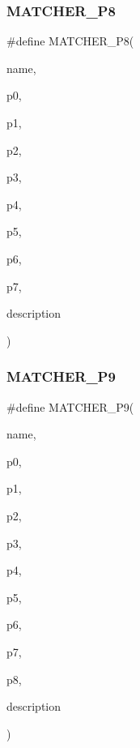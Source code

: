 \subsubsection{\texorpdfstring{MATCHER\_P8}{MATCHER\_P8}}
{\footnotesize\ttfamily \#define M\+A\+T\+C\+H\+E\+R\+\_\+\+P8(\begin{DoxyParamCaption}\item[{}]{name,  }\item[{}]{p0,  }\item[{}]{p1,  }\item[{}]{p2,  }\item[{}]{p3,  }\item[{}]{p4,  }\item[{}]{p5,  }\item[{}]{p6,  }\item[{}]{p7,  }\item[{}]{description }\end{DoxyParamCaption})}

\mbox{\label{gmock-generated-matchers_8h_a2dc1db146d4112c9fde1c2708807e43e}} 
\subsubsection{\texorpdfstring{MATCHER\_P9}{MATCHER\_P9}}
{\footnotesize\ttfamily \#define M\+A\+T\+C\+H\+E\+R\+\_\+\+P9(\begin{DoxyParamCaption}\item[{}]{name,  }\item[{}]{p0,  }\item[{}]{p1,  }\item[{}]{p2,  }\item[{}]{p3,  }\item[{}]{p4,  }\item[{}]{p5,  }\item[{}]{p6,  }\item[{}]{p7,  }\item[{}]{p8,  }\item[{}]{description }\end{DoxyParamCaption})}

